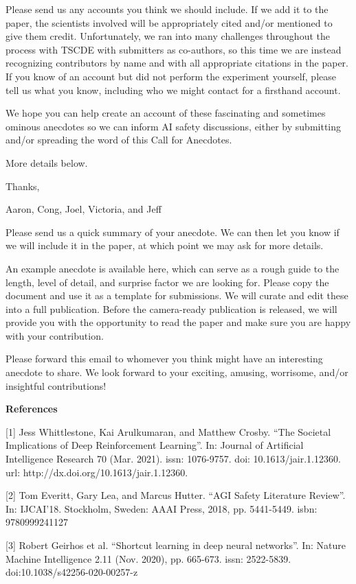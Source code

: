 \begin{mdframed}
Please send us any accounts you think we should include. If we add it to the paper, the scientists involved will be appropriately cited and/or mentioned to give them credit. Unfortunately, we ran into many challenges throughout the process with TSCDE with submitters as co-authors, so this time we are instead recognizing contributors by name and with all appropriate citations in the paper. If you know of an account but did not perform the experiment yourself, please tell us what you know, including who we might contact for a firsthand account.

We hope you can help create an account of these fascinating and sometimes ominous anecdotes so we can inform AI safety discussions, either by submitting and/or spreading the word of this Call for Anecdotes.

More details below.

Thanks,

Aaron, Cong, Joel, Victoria, and Jeff

\medskip

Please send us a quick summary of your anecdote. We can then let you know if we will include it in the paper, at which point we may ask for more details.

An example anecdote is available here, which can serve as a rough guide to the length, level of detail, and surprise factor we are looking for. Please copy the document and use it as a template for submissions. We will curate and edit these into a full publication. Before the camera-ready publication is released, we will provide you with the opportunity to read the paper and make sure you are happy with your contribution.

Please forward this email to whomever you think might have an interesting anecdote to share. We look forward to your exciting, amusing, worrisome, and/or insightful contributions!

\medskip
\textbf{References}

[1] Jess Whittlestone, Kai Arulkumaran, and Matthew Crosby. ``The Societal Implications of Deep Reinforcement Learning''. In: Journal of Artificial Intelligence Research 70 (Mar. 2021). issn: 1076-9757. doi: 10.1613/jair.1.12360. url: http://dx.doi.org/10.1613/jair.1.12360.

[2] Tom Everitt, Gary Lea, and Marcus Hutter. ``AGI Safety Literature Review''. In: IJCAI'18. Stockholm, Sweden: AAAI Press, 2018, pp. 5441-5449. isbn: 9780999241127

[3] Robert Geirhos et al. ``Shortcut learning in deep neural networks''. In: Nature Machine Intelligence 2.11 (Nov. 2020), pp. 665-673. issn: 2522-5839. doi:10.1038/s42256-020-00257-z

\end{mdframed}

